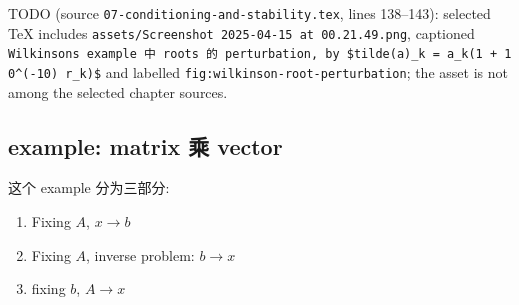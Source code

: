 TODO (source \texttt{07-conditioning-and-stability.tex}, lines 138--143): selected TeX includes \texttt{assets/Screenshot\ 2025-04-15\ at\ 00.21.49.png}, captioned \texttt{Wilkinson\textquotesingle{}s\ example\ 中\ roots\ 的\ perturbation,\ by\ \$tilde(a)\_k\ =\ a\_k(1\ +\ 10\^{}(-10)\ r\_k)\$} and labelled \texttt{fig:wilkinson-root-perturbation}; the asset is not among the selected chapter sources.

\subsection{example: matrix 乘 vector}

这个 example 分为三部分:

\begin{enumerate}
\tightlist
\item
  Fixing \(A\), \(x\rightarrow b\)
\item
  Fixing \(A\), inverse problem: \(b\rightarrow x\)
\item
  fixing \(b\), \(A\rightarrow x\)
\end{enumerate}

